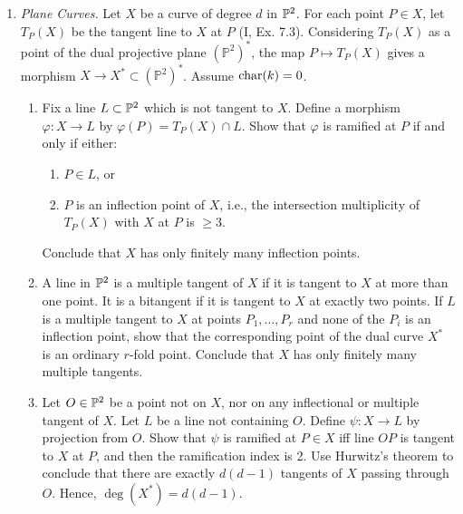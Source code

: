 \documentclass{article}
\begin{document}
\begin{enumerate} [label=\textbf{\arabic*.}, leftmargin=0em]
\begin{enumerate} [label=(\alph*)]
    \item Summing up, conclude that there is a one-to-one correspondence between the set of isomorphism classes of curves of genus 2 over $k$, and triples of distinct elements $\beta_1, \beta_2, \beta_3$ of $k, \neq 0, 1$, modulo the action of $\Sigma_6$ described in (d).
    In particular, there are many non-isomorphic curves of genus 2.
    We say that curves of genus 2 depend on three parameters, since they correspond to the points of an open subset of $\A^3$ modulo a finite group.
\end{enumerate}

\item \textit{Plane Curves.} Let $X$ be a curve of degree $d$ in $\mathbb{P}^2$.
For each point $P \in X$, let $T_P(X)$ be the tangent line to $X$ at $P$ (I, Ex. 7.3).
Considering $T_P(X)$ as a point of the dual projective plane $(\mathbb{P}^2)^*$, the map $P \mapsto T_P(X)$ gives a morphism $X \to X^* \subset (\mathbb{P}^2)^*$.
Assume $\operatorname{char}(k) = 0$.
\begin{enumerate}[label=(\alph*)]
    \item Fix a line $L \subset \mathbb{P}^2$ which is not tangent to $X$. Define a morphism $\varphi: X \to L$ by $\varphi(P) = T_P(X) \cap L$. Show that $\varphi$ is ramified at $P$ if and only if either:
    \begin{enumerate}
        \item $P \in L$, or
        \item $P$ is an inflection point of $X$, i.e., the intersection multiplicity of $T_P(X)$ with $X$ at $P$ is $\geq 3$.
    \end{enumerate}
    Conclude that $X$ has only finitely many inflection points.

    \item A line in $\mathbb{P}^2$ is a multiple tangent of $X$ if it is tangent to $X$ at more than one point.
    It is a bitangent if it is tangent to $X$ at exactly two points.
    If $L$ is a multiple tangent to $X$ at points $P_1, \dots, P_r$ and none of the $P_i$ is an inflection point, show that the corresponding point of the dual curve $X^*$ is an ordinary $r$-fold point.
    Conclude that $X$ has only finitely many multiple tangents.

    \item Let $O \in \mathbb{P}^2$ be a point not on $X$, nor on any inflectional or multiple tangent of $X$.
    Let $L$ be a line not containing $O$.
    Define $\psi: X \to L$ by projection from $O$. Show that $\psi$ is ramified at $P \in X$ iff line $OP$ is tangent to $X$ at $P$, and then the ramification index is 2.
    Use Hurwitz's theorem to conclude that there are exactly $d(d - 1)$ tangents of $X$ passing through $O$.
    Hence, $\deg(X^*) = d(d - 1)$.


\end{enumerate}
\end{enumerate}
\end{document}
